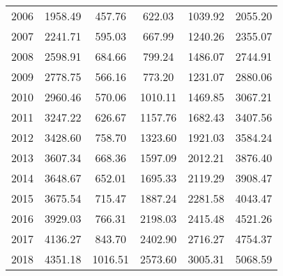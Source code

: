 \begin{center}
\begin{longtable}{|r|c|c|c|c|l|}
	2006 & 1958.49 & 457.76  & 622.03  & 1039.92 & 2055.20 \\
	2007 & 2241.71 & 595.03  & 667.99  & 1240.26 & 2355.07 \\
	2008 & 2598.91 & 684.66  & 799.24  & 1486.07 & 2744.91 \\
	2009 & 2778.75 & 566.16  & 773.20  & 1231.07 & 2880.06 \\
	2010 & 2960.46 & 570.06  & 1010.11 & 1469.85 & 3067.21 \\
	2011 & 3247.22 & 626.67  & 1157.76 & 1682.43 & 3407.56 \\
	2012 & 3428.60 & 758.70  & 1323.60 & 1921.03 & 3584.24 \\
	2013 & 3607.34 & 668.36  & 1597.09 & 2012.21 & 3876.40 \\
	2014 & 3648.67 & 652.01  & 1695.33 & 2119.29 & 3908.47 \\
	2015 & 3675.54 & 715.47  & 1887.24 & 2281.58 & 4043.47 \\
	2016 & 3929.03 & 766.31  & 2198.03 & 2415.48 & 4521.26 \\
	2017 & 4136.27 & 843.70  & 2402.90 & 2716.27 & 4754.37 \\
	2018 & 4351.18 & 1016.51 & 2573.60 & 3005.31 & 5068.59 \\ \hline
	\end{longtable}
\end{center}

